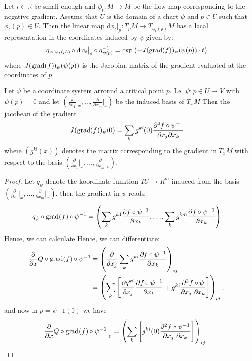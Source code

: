 \begin{lemma}
	Let $t\in \mathbb{R}$ be small enough and $\phi_t: M\to M$ be the flow map corresponding to the negative gradient. Assume that $U$ is the domain of a chart $\psi$ and $p\in U$ such that $\phi_t(p)\in U$. Then the linear map $\mathrm{d} \phi_t \big|_p: T_pM\to T_{\phi_t(p)}M$ has a local representation in the coordinates induced by $\psi$ given by:
	\[
	q_{\psi(\varphi_t(p))} \circ \mathrm{d} \varphi_t \big|_p \circ q_{\psi(p)}^{-1} = \exp\left(-J(\mathrm{grad}(f))_\psi(\psi(p)) \cdot t\right)
	\]
	where $J(\mathrm{grad}(f))_\psi(\psi(p))$ is the Jacobian matrix of the gradient evaluated at the coordinates of $p$.
\end{lemma}
\begin{lemma}
	Let $\psi$ be a coordinate system arround a critical point $p$. I.e. $\psi: p\in U\to V$ with $\psi(p)=0$ and let $\left( \frac{\partial}{\partial x_1}\big|_x,\dots ,\frac{\partial}{\partial x_m}\big|_x\right)$ be the induced basis of $T_xM$ Then the jacobean of the gradient 
	\begin{equation}
			J(\mathrm{grad}(f))_\psi(0)= \sum_{k}g^{ki}(0)\frac{\partial ^2 f\circ \psi^{-1} }{\partial x_j \partial x_k}
	\end{equation} where $(g^{ki}(x))$ denotes the matrix corresponding to the gradient in $T_xM$ with respect to the basis $\left( \frac{\partial}{\partial x_1}\big|_x,\dots ,\frac{\partial}{\partial x_m}\big|_x\right)$.
\end{lemma}
\begin{proof}
	Let $q_{\psi}$ denote the koordinate funktion $TU\to R^m$ induced from the basis $\left( \frac{\partial}{\partial x_1}\big|_x,\dots ,\frac{\partial}{\partial x_m}\big|_x\right)$. then the gradient in $\psi$ reads:
	\begin{align*}
		q_{\psi}\circ \mathrm{grad}(f)\circ \psi^{-1}=\left(\sum_kg^{k1  }\frac{\partial f\circ \psi^{-1}	}{\partial x_k},\dots, \sum_kg^{k m }\frac{\partial f\circ \psi^{-1}	}{\partial x_k}\right)
	\end{align*} Hence, we can calculate 
	Hence, we can differentiate: 
	\begin{align*}
		\frac{\partial}{\partial x}  Q\circ \mathrm{grad}(f)\circ \psi^{-1}
		&= \left(\frac{\partial}{\partial x_j} \sum_k g^{ki}\frac{\partial f \circ \psi^{-1}}{\partial x_k}\right)_{ij} \\
		&= \left(\sum_k \left[ 
		\frac{\partial g^{ki}}{\partial x_j}\frac{\partial f \circ \psi^{-1}}{\partial x_k} +  g^{ki}\frac{\partial^2 f \circ \psi}{\partial x_j ~\partial x_k}
		\right]\right)_{ij} \, .
	\end{align*}
	and now in $p=\psi{-1}(0)$ we have
	\begin{align*}
		\frac{\partial}{\partial x}  Q\circ \mathrm{grad}(f)\circ \psi^{-1} \Big|_{0}=\left(\sum_k \left[ 
		g^{ki}(0)\frac{\partial^2 f \circ \psi^{-1}}{\partial x_j ~\partial x_k}
		\right]\right)_{ij} \, .
	\end{align*}
\end{proof}








